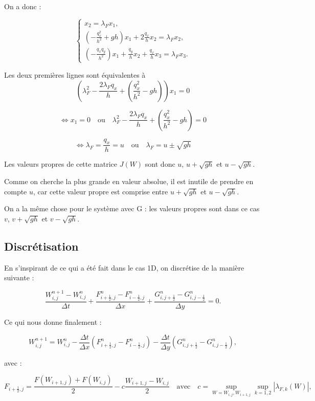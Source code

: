 \documentclass[
11pt, %
francais, %
singlespacing, %
headsepline, %
f%
]{MastersDoctoralThesis} %
\theoremstyle{definition}
\begin{document}
On a donc : 

$$\left\{
    \begin{array}{lll}
        x_2 = \lambda _F x_1, \\
        (-\frac{q_x^2}{h^2} + gh ) x_1 + 2 \frac{q_x}{h} x_2 = \lambda _F x_2,  \\
        (-\frac{q_x q_y}{h^2} ) x_1 + \frac{q_y}{h} x_2 + \frac{q_x}{h} x_3 = \lambda _F x_3.
    \end{array}
\right.
$$

Les deux premières lignes sont équivalentes à $$ ( \lambda _F ^2 - \frac{2 \lambda _F q_x}{h} + (\frac{q_x^2}{h^2} - gh)) x_1 = 0$$

$$ \Leftrightarrow x_1 = 0 \quad \text{ou} \quad \lambda _F ^2 - \frac{2 \lambda _F q_x}{h} + (\frac{q_x^2}{h^2} - gh ) = 0 $$

$$ \Leftrightarrow  \lambda _F = \frac{q_x}{h} = u \quad \text{ou} \quad \lambda _F = u \pm \sqrt{gh} $$

Les valeurs propres de cette matrice $J(W)$ sont donc $u$, $u + \sqrt{gh}$ et $u - \sqrt{gh}$.

Comme on cherche la plus grande en valeur absolue, il est inutile de prendre en compte $u$, car cette valeur propre est comprise entre $u + \sqrt{gh}$ et $u - \sqrt{gh}$.

On a la même chose pour le système avec G : les valeurs propres sont dans ce cas $v$, $v + \sqrt{gh}$ et $v - \sqrt{gh}$.


\subsection{Discrétisation}

En s'inspirant de ce qui a été fait dans le cas 1D, on discrétise de la manière suivante :

$$ \frac{ W_{i,j}^{n+1} - W_{i,j}^{n} }{\Delta t} + \frac{ F_{i+\frac{1}{2},j}^{n} -  F_{i-\frac{1}{2},j}^{n} }{\Delta x} + \frac{G_{i,j+\frac{1}{2}}^{n} -  G_{i,j-\frac{1}{2}}^{n} }{\Delta y} = 0. $$

Ce qui nous donne finalement :

$$  W_{i,j}^{n+1} = W_{i,j}^n - \frac{\Delta t}{\Delta x} ( F_{i+\frac{1}{2},j}^{n} -  F_{i-\frac{1}{2},j}^{n} ) - \frac{\Delta t}{\Delta y} ( G_{i,j+\frac{1}{2}}^{n} -  G_{i,j-\frac{1}{2}}^{n} ),$$

avec : 

$$ F_{i+\frac{1}{2},j} =  \frac{ F(W_{i+1,j}) + F(W_{i,j}) }{2} - c \frac{ W_{i+1,j} - W_{i,j} }{2} \quad \text{avec} \quad c = \sup_{W =  W_{i,j} ,  W_{i+1,j}} \sup_{k = 1,2} | \lambda _{F,k}(W) |, $$
\end{document}
